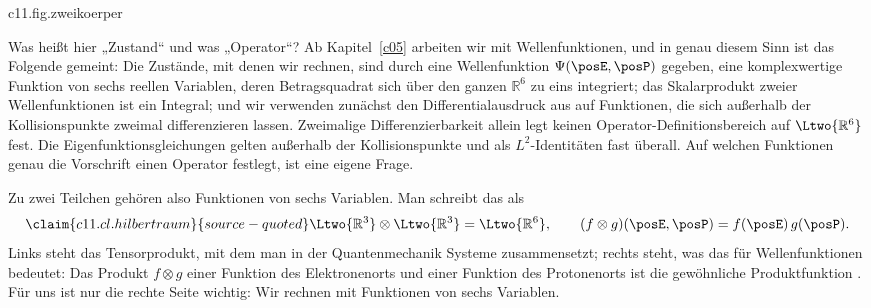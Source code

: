 \begin{tpcfigure}{c11.fig.zweikoerper}
  \caption{Die Orte $\posE$ des Elektrons und $\posP$ des Protons, vom Ursprung $O$ aus
    gemessen, und die beiden neuen Koordinaten aus Abschnitt~\ref{c11.s2}: die
    Schwerpunktskoordinate $\posCM$ und die Relativkoordinate $\posRel = \posE - \posP$.
    Der Schwerpunkt teilt die Verbindungsstrecke im Verhältnis der Massen. Das Bild ist
    für das Massenverhältnis $\massP : \massE = 3 : 1$ gezeichnet, damit man den
    Schwerpunkt vom Proton unterscheiden kann; das ist nicht das Verhältnis im
    Wasserstoffatom.}
\end{tpcfigure}

Was heißt hier „Zustand“ und was „Operator“? Ab Kapitel~\ref{c05} arbeiten wir mit
Wellenfunktionen, und in genau diesem Sinn ist das Folgende gemeint: Die Zustände, mit
denen wir rechnen, sind durch eine Wellenfunktion $\Psi(\posE, \posP)$ gegeben, eine
komplexwertige Funktion von sechs reellen Variablen, deren Betragsquadrat sich über den
ganzen $\mathbb{R}^6$ zu eins integriert; das Skalarprodukt zweier Wellenfunktionen ist
ein Integral; und wir verwenden zunächst den Differentialausdruck aus 
auf Funktionen, die sich außerhalb der Kollisionspunkte zweimal differenzieren lassen.
Zweimalige Differenzierbarkeit allein legt keinen Operator-Definitionsbereich auf
$\Ltwo{\mathbb{R}^6}$ fest. Die Eigenfunktionsgleichungen gelten außerhalb der
Kollisionspunkte und als $L^2$-Identitäten fast überall. Auf welchen Funktionen genau
die Vorschrift einen Operator festlegt, ist eine eigene Frage.

Zu zwei Teilchen gehören also Funktionen von sechs Variablen. Man schreibt das als
\begin{equation}\label{c11.eq.hilbertraum}\claim{c11.cl.hilbertraum}{source-quoted}
  \Ltwo{\mathbb{R}^3} \otimes \Ltwo{\mathbb{R}^3} = \Ltwo{\mathbb{R}^6},
  \qquad
  (f \otimes g)(\posE, \posP) = f(\posE)\, g(\posP).
\end{equation}
Links steht das Tensorprodukt, mit dem man in der Quantenmechanik Systeme zusammensetzt;
rechts steht, was das für Wellenfunktionen bedeutet: Das Produkt $f \otimes g$ einer
Funktion des Elektronenorts und einer Funktion des Protonenorts ist die gewöhnliche
Produktfunktion . Für uns ist nur die
rechte Seite wichtig: Wir rechnen mit Funktionen von sechs Variablen.

